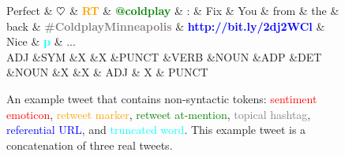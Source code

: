 \documentclass[11pt,a4paper]{article}
\newcommand{\heart}{\ensuremath\heartsuit}
\begin{document}
\begin{figure}[t]
	\centering
	\small
	\begin{dependency}[edge slant=2, text only label, label style=above]
		\begin{deptext}
			Perfect \& \textcolor{red}{\bf $\heart$} \& \textcolor{orange}{\bf RT} \& \textcolor{green}{\bf @coldplay} \& : \& Fix \& You \& from \& the \& back \& \textcolor{gray}{\bf \#ColdplayMinneapolis} \& \textcolor{blue}{\bf http://bit.ly/2dj2WCl} \& Nice \& \textcolor{cyan}{\bf p} \& ...\\
			\tiny ADJ \&\tiny SYM \&\tiny X \&\tiny X \&\tiny PUNCT \&\tiny VERB \&\tiny NOUN \&\tiny ADP \&\tiny DET \&\tiny NOUN \&\tiny X \&\tiny X \& \tiny ADJ \& \tiny X \& \tiny PUNCT \\
		\end{deptext}
	\end{dependency}
	\caption{An example tweet that contains non-syntactic tokens:
		\textcolor{red}{sentiment emoticon},
		\textcolor{orange}{retweet marker},
		\textcolor{green}{retweet at-mention},
		\textcolor{gray}{topical hashtag},
		\textcolor{blue}{referential URL}, and
		\textcolor{cyan}{truncated word}.
		This example tweet is a concatenation of three real tweets.
	}\label{fig:non-syn-toks}
\end{figure}
\end{document}
